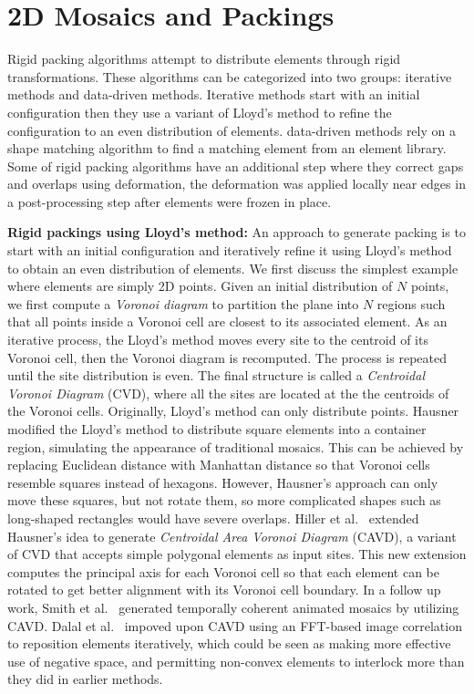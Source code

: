 \section{2D Mosaics and Packings}

Rigid packing algorithms attempt to distribute elements through rigid transformations.
These algorithms can be categorized into two groups: iterative methods and data-driven methods.
Iterative methods start with an initial configuration then they use a variant of Lloyd's method 
to refine the configuration to an even distribution of elements.
data-driven methods rely on a shape matching algorithm to find a matching element from
an element library.
Some of rigid packing algorithms have an additional step where they 
correct gaps and overlaps using deformation, the deformation was applied
locally near edges in a post-processing step after elements
were frozen in place.

\textbf{Rigid packings using Lloyd's method:}
An approach to generate packing is to start with an initial configuration and iteratively refine it using Lloyd's method
to obtain an even distribution of elements. 
We first discuss the simplest example where elements are simply 2D points.
Given an initial distribution of $N$ points, 
we first compute a \textit{Voronoi diagram} to partition the plane into $N$ regions such that
all points inside a Voronoi cell are closest to its associated element.
As an iterative process, 
the Lloyd's method moves every site to the centroid of its Voronoi cell, 
then the Voronoi diagram is recomputed.
The process is repeated until the site distribution is even.
The final structure is called a \textit{Centroidal Voronoi Diagram} (CVD), 
where all the sites are located at the the centroids of the Voronoi cells.  
Originally, Lloyd's method can only distribute points.
Hausner~\cite{Hausner2001} modified the Lloyd's method to distribute square elements into a container 
region, simulating the appearance of traditional mosaics. 
This can be achieved by replacing Euclidean distance with Manhattan distance so that Voronoi cells resemble squares instead of hexagons.
However, Hausner's approach can only move these squares, but not rotate them,
so more complicated shapes such as long-shaped rectangles would have severe overlaps.
Hiller et al.~\cite{Hiller2003} extended Hausner's idea to generate \textit{Centroidal Area Voronoi Diagram} (CAVD),
a variant of CVD that accepts simple polygonal elements as input sites.
This new extension computes the principal axis for each Voronoi cell so that 
each element can be rotated to get better alignment
with its Voronoi cell boundary.
In a follow up work, Smith et al.~\cite{Smith2005} generated temporally coherent animated mosaics by utilizing CAVD.
Dalal et al.~\cite{Dalal2006} impoved upon CAVD using an FFT-based image correlation to reposition
elements iteratively, which could be seen as making more effective use of negative
space, and permitting non-convex elements to interlock more than they did in
earlier methods.


